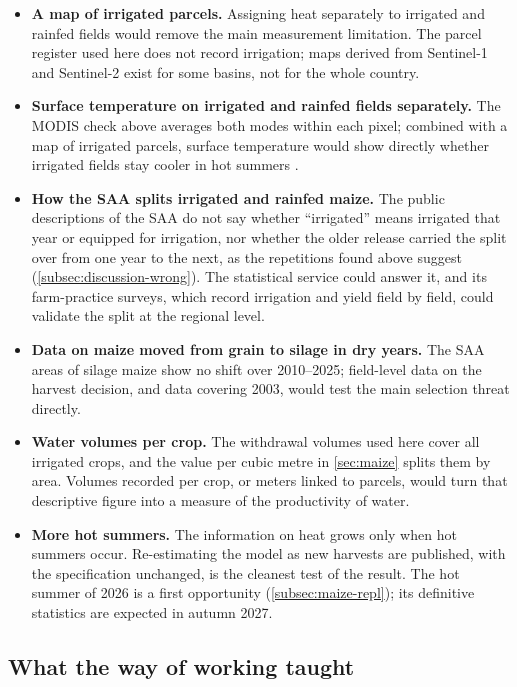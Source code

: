 \begin{itemize}
  \item \textbf{A map of irrigated parcels.} Assigning heat separately to irrigated and rainfed fields would remove the main measurement limitation. The parcel register used here does not record irrigation; maps derived from Sentinel-1 and Sentinel-2 exist for some basins, not for the whole country.
  \item \textbf{Surface temperature on irrigated and rainfed fields separately.} The MODIS check above averages both modes within each pixel; combined with a map of irrigated parcels, surface temperature would show directly whether irrigated fields stay cooler in hot summers \parencite{zhu2022}.
  \item \textbf{How the SAA splits irrigated and rainfed maize.} The public descriptions of the SAA do not say whether ``irrigated'' means irrigated that year or equipped for irrigation, nor whether the older release carried the split over from one year to the next, as the repetitions found above suggest (\cref{subsec:discussion-wrong}). The statistical service could answer it, and its farm-practice surveys, which record irrigation and yield field by field, could validate the split at the regional level.
  \item \textbf{Data on maize moved from grain to silage in dry years.} The SAA areas of silage maize show no shift over 2010--2025; field-level data on the harvest decision, and data covering 2003, would test the main selection threat directly.
  \item \textbf{Water volumes per crop.} The withdrawal volumes used here cover all irrigated crops, and the value per cubic metre in \cref{sec:maize} splits them by area. Volumes recorded per crop, or meters linked to parcels, would turn that descriptive figure into a measure of the productivity of water.
  \item \textbf{More hot summers.} The information on heat grows only when hot summers occur. Re-estimating the model as new harvests are published, with the specification unchanged, is the cleanest test of the result. The hot summer of 2026 is a first opportunity (\cref{subsec:maize-repl}); its definitive statistics are expected in autumn 2027.
\end{itemize}

\subsection{What the way of working taught}

